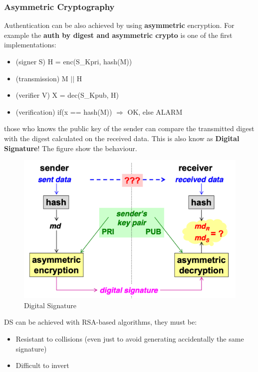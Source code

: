 \documentclass[12pt]{article}
\begin{document}
\subsubsection{Asymmetric Cryptography}
Authentication can be also achieved by using \textbf{asymmetric} encryption. For example the \textbf{auth by digest and asymmetric crypto} is one of the first implementations:
\begin{itemize}
  \item (signer S) H = enc(S\_Kpri, hash(M))
  \item (transmission) M $||$ H
  \item (verifier V) X = dec(S\_Kpub, H)
  \item (verification) if(x == hash(M)) $\Rightarrow$ OK, else ALARM
\end{itemize}
those who knows the public key of the sender can compare the transmitted digest with the digest calculated on the received data. This is also know as \textbf{Digital Signature}! The figure show the behaviour.
\begin{figure}[H]
   \centering
   \includegraphics[width=\linewidth]{images/ds.png}
   \caption{Digital Signature}
   \label{fig:ds}
\end{figure}
DS can be achieved with RSA-based algorithms, they must be:
\begin{itemize}
  \item Resistant to collisions (even just to avoid generating accidentally the same signature)
  \item Difficult to invert
\end{itemize}
\end{document}
